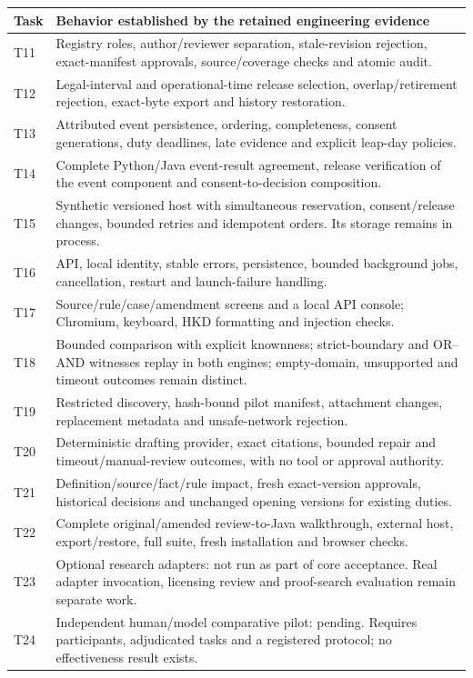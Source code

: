 \documentclass[12pt,a4paper,oneside,openany]{book}
\begin{document}
\endgroup
\begin{longtable}{@{}P{0.09\textwidth}P{0.86\textwidth}@{}}

\toprule Task & Behavior established by the retained engineering evidence \\\midrule
\endhead
T11 & Registry roles, author/reviewer separation, stale-revision rejection, exact-manifest approvals, source/coverage checks and atomic audit.\\
T12 & Legal-interval and operational-time release selection, overlap/retirement rejection, exact-byte export and history restoration.\\
T13 & Attributed event persistence, ordering, completeness, consent generations, duty deadlines, late evidence and explicit leap-day policies.\\
T14 & Complete Python/Java event-result agreement, release verification of the event component and consent-to-decision composition.\\
T15 & Synthetic versioned host with simultaneous reservation, consent/release changes, bounded retries and idempotent orders. Its storage remains in process.\\
T16 & API, local identity, stable errors, persistence, bounded background jobs, cancellation, restart and launch-failure handling.\\
T17 & Source/rule/case/amendment screens and a local API console; Chromium, keyboard, HKD formatting and injection checks.\\
T18 & Bounded comparison with explicit knownness; strict-boundary and OR--AND witnesses replay in both engines; empty-domain, unsupported and timeout outcomes remain distinct.\\
T19 & Restricted discovery, hash-bound pilot manifest, attachment changes, replacement metadata and unsafe-network rejection.\\
T20 & Deterministic drafting provider, exact citations, bounded repair and timeout/manual-review outcomes, with no tool or approval authority.\\
T21 & Definition/source/fact/rule impact, fresh exact-version approvals, historical decisions and unchanged opening versions for existing duties.\\
T22 & Complete original/amended review-to-Java walkthrough, external host, export/restore, full suite, fresh installation and browser checks.\\
T23 & Optional research adapters: not run as part of core acceptance. Real adapter invocation, licensing review and proof-search evaluation remain separate work.\\
T24 & Independent human/model comparative pilot: pending. Requires participants, adjudicated tasks and a registered protocol; no effectiveness result exists.\\
\bottomrule
\end{longtable}
\endgroup
\end{document}

